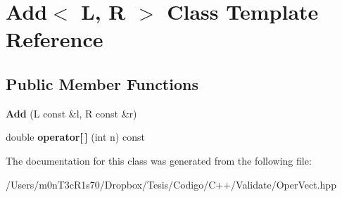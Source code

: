 \hypertarget{class_add}{}\section{Add$<$ L, R $>$ Class Template Reference}
\label{class_add}
\subsection*{Public Member Functions}
\begin{DoxyCompactItemize}
\item 
\hypertarget{class_add_a59d7849857087ed648c9ac436e57c41e}{}\label{class_add_a59d7849857087ed648c9ac436e57c41e} 
{\bfseries Add} (L const \&l, R const \&r)
\item 
\hypertarget{class_add_a6dc5be99add5432112bd72e4a679cc87}{}\label{class_add_a6dc5be99add5432112bd72e4a679cc87} 
double {\bfseries operator\mbox{[}$\,$\mbox{]}} (int n) const
\end{DoxyCompactItemize}


The documentation for this class was generated from the following file\+:\begin{DoxyCompactItemize}
\item 
/\+Users/m0n\+T3c\+R1s70/\+Dropbox/\+Tesis/\+Codigo/\+C++/\+Validate/Oper\+Vect.\+hpp\end{DoxyCompactItemize}
